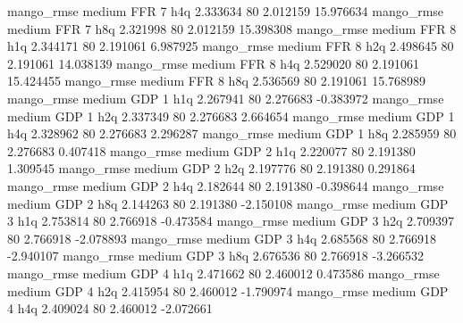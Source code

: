        mango_rmse     medium      FFR                 7                  h4q  2.333634 80       2.012159          15.976634
       mango_rmse     medium      FFR                 7                  h8q  2.321998 80       2.012159          15.398308
       mango_rmse     medium      FFR                 8                  h1q  2.344171 80       2.191061           6.987925
       mango_rmse     medium      FFR                 8                  h2q  2.498645 80       2.191061          14.038139
       mango_rmse     medium      FFR                 8                  h4q  2.529020 80       2.191061          15.424455
       mango_rmse     medium      FFR                 8                  h8q  2.536569 80       2.191061          15.768989
       mango_rmse     medium      GDP                 1                  h1q  2.267941 80       2.276683          -0.383972
       mango_rmse     medium      GDP                 1                  h2q  2.337349 80       2.276683           2.664654
       mango_rmse     medium      GDP                 1                  h4q  2.328962 80       2.276683           2.296287
       mango_rmse     medium      GDP                 1                  h8q  2.285959 80       2.276683           0.407418
       mango_rmse     medium      GDP                 2                  h1q  2.220077 80       2.191380           1.309545
       mango_rmse     medium      GDP                 2                  h2q  2.197776 80       2.191380           0.291864
       mango_rmse     medium      GDP                 2                  h4q  2.182644 80       2.191380          -0.398644
       mango_rmse     medium      GDP                 2                  h8q  2.144263 80       2.191380          -2.150108
       mango_rmse     medium      GDP                 3                  h1q  2.753814 80       2.766918          -0.473584
       mango_rmse     medium      GDP                 3                  h2q  2.709397 80       2.766918          -2.078893
       mango_rmse     medium      GDP                 3                  h4q  2.685568 80       2.766918          -2.940107
       mango_rmse     medium      GDP                 3                  h8q  2.676536 80       2.766918          -3.266532
       mango_rmse     medium      GDP                 4                  h1q  2.471662 80       2.460012           0.473586
       mango_rmse     medium      GDP                 4                  h2q  2.415954 80       2.460012          -1.790974
       mango_rmse     medium      GDP                 4                  h4q  2.409024 80       2.460012          -2.072661
